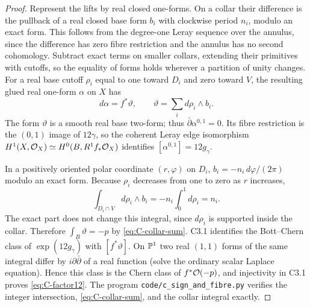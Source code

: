 \begin{proof}
Represent the lifts by real closed one-forms.  On a collar their
difference is the pullback of a real closed base form $b_i$ with
clockwise period $n_i$, modulo an exact form.  This follows from the
degree-one Leray sequence over the annulus, since the difference has
zero fibre restriction and the annulus has no second cohomology.
Subtract exact terms on smaller collars, extending their primitives
with cutoffs, so the equality of forms holds wherever a partition of
unity changes.  For a real base cutoff $\rho_i$ equal to one toward
$D_i$ and zero toward $V$, the resulting glued real one-form $\alpha$
on $X$ has
\[
d\alpha=f^*\vartheta,\qquad
\vartheta=\sum_i d\rho_i\wedge b_i.
\]
The form $\vartheta$ is a smooth real base two-form; thus
$\bar\partial\alpha^{0,1}=0$.  Its fibre restriction is the
$(0,1)$ image of $12\gamma$, so the coherent Leray edge isomorphism
$H^1(X,\mathcal O_X)\simeq H^0(B,R^1f_*\mathcal O_X)$ identifies
$[\alpha^{0,1}]=12g_\gamma$.

In a positively oriented polar coordinate $(r,\varphi)$ on $D_i$,
$b_i=-n_i\,d\varphi/(2\pi)$ modulo an exact form.
Because $\rho_i$ decreases from one to zero as $r$ increases,
\[
\int_{D_i\cap V}d\rho_i\wedge b_i
=-n_i\int_0^1d\rho_i=n_i.
\]
The exact part does not change this integral, since $d\rho_i$ is
supported inside the collar.  Therefore
$\int_B\vartheta=-p$ by \eqref{eq:C-collar-sum}.  C3.1 identifies
the Bott--Chern class of $\exp(12g_\gamma)$ with $[f^*\vartheta]$.
On $\mathbb P^1$ two real $(1,1)$ forms of the same integral differ by
$i\partial\bar\partial$ of a real function (solve the ordinary
scalar Laplace equation).  Hence this class is the Chern class of
$f^*\mathcal O(-p)$, and injectivity in C3.1 proves
\eqref{eq:C-factor12}.  The program
\texttt{code/c\_sign\_and\_fibre.py} verifies the integer
intersection, \eqref{eq:C-collar-sum}, and the collar integral exactly.
\end{proof}

